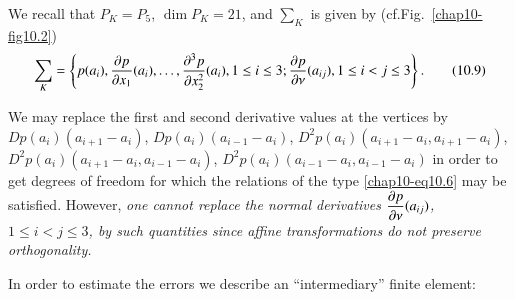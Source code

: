 We recall that $P_{K}=P_{5}$, $\dim P_{K}=21$, and $\sum_{K}$ is given
by (cf.\@ Fig.~\ref{chap10-fig10.2})
\begin{equation*}
\sum_{K}=\left\{p(a_{i}),\frac{\partial p}{\partial
  x_{1}}(a_{i}),\ldots,\frac{\partial^{3}p}{\partial x^{2}_{2}}(a_{i}), 1\leq
i\leq 3; \frac{\partial p}{\partial \nu}(a_{ij}),1\leq i<j\leq
3\right\}.\tag{10.9}\label{chap10-eq10.9} 
\end{equation*}

We may replace the first and second derivative values at the vertices
by $Dp(a_{i})(a_{i+1}-a_{i})$, $Dp(a_{i})(a_{i-1}-a_{i})$,
$D^{2}p(a_{i})(a_{i+1}-a_{i},a_{i+1}-a_{i})$,
$D^{2}p(a_{i})(a_{i+1}-a_{i},a_{i-1}-a_{i})$,
$D^{2}p(a_{i})(a_{i-1}-a_{i},a_{i-1}-a_{i})$ in order to get degrees
of freedom for which the relations of the type \eqref{chap10-eq10.6}
may be satisfied. However, {\em one cannot replace the normal
  derivatives $\dfrac{\partial p}{\partial \nu}(a_{ij})$, $1\leq i<j\leq 3$, by
  such quantities since affine transformations do not preserve
  orthogonality.}

In order to estimate the errors we describe an ``intermediary'' finite
element:


